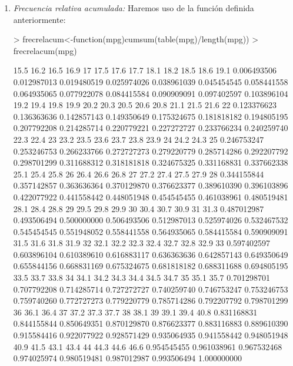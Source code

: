 \documentclass [a4paper] {article}
\begin{document}
\begin{enumerate}
\item
\textit{Frecuencia relativa acumulada: }Haremos uso de la funci\'on definida anteriormente:
\begin{Schunk}
\begin{Sinput}
> frecrelacum<-function(mpg){cumsum(table(mpg)/length(mpg))}
> frecrelacum(mpg)
\end{Sinput}
\begin{Soutput}
       15.5        16.2        16.5        16.9          17        17.5        17.6        17.7        18.1        18.2        18.5        18.6        19.1 
0.006493506 0.012987013 0.019480519 0.025974026 0.038961039 0.045454545 0.058441558 0.064935065 0.077922078 0.084415584 0.090909091 0.097402597 0.103896104 
       19.2        19.4        19.8        19.9        20.2        20.3        20.5        20.6        20.8        21.1        21.5        21.6          22 
0.123376623 0.136363636 0.142857143 0.149350649 0.175324675 0.181818182 0.194805195 0.207792208 0.214285714 0.220779221 0.227272727 0.233766234 0.240259740 
       22.3        22.4          23        23.2        23.5        23.6        23.7        23.8        23.9          24        24.2        24.3          25 
0.246753247 0.253246753 0.266233766 0.272727273 0.279220779 0.285714286 0.292207792 0.298701299 0.311688312 0.318181818 0.324675325 0.331168831 0.337662338 
       25.1        25.4        25.8          26        26.4        26.6        26.8          27        27.2        27.4        27.5        27.9          28 
0.344155844 0.357142857 0.363636364 0.370129870 0.376623377 0.389610390 0.396103896 0.422077922 0.441558442 0.448051948 0.454545455 0.461038961 0.480519481 
       28.1        28.4        28.8          29        29.5        29.8        29.9          30        30.4        30.7        30.9          31        31.3 
0.487012987 0.493506494 0.500000000 0.506493506 0.512987013 0.525974026 0.532467532 0.545454545 0.551948052 0.558441558 0.564935065 0.584415584 0.590909091 
       31.5        31.6        31.8        31.9          32        32.1        32.2        32.3        32.4        32.7        32.8        32.9          33 
0.597402597 0.603896104 0.610389610 0.616883117 0.636363636 0.642857143 0.649350649 0.655844156 0.668831169 0.675324675 0.681818182 0.688311688 0.694805195 
       33.5        33.7        33.8          34        34.1        34.2        34.3        34.4        34.5        34.7          35        35.1        35.7 
0.701298701 0.707792208 0.714285714 0.727272727 0.740259740 0.746753247 0.753246753 0.759740260 0.772727273 0.779220779 0.785714286 0.792207792 0.798701299 
         36        36.1        36.4          37        37.2        37.3        37.7          38        38.1          39        39.1        39.4        40.8 
0.831168831 0.844155844 0.850649351 0.870129870 0.876623377 0.883116883 0.889610390 0.915584416 0.922077922 0.928571429 0.935064935 0.941558442 0.948051948 
       40.9        41.5        43.1        43.4          44        44.3        44.6        46.6 
0.954545455 0.961038961 0.967532468 0.974025974 0.980519481 0.987012987 0.993506494 1.000000000 
\end{Soutput}
\end{Schunk}
\end{enumerate}
\end{document}
